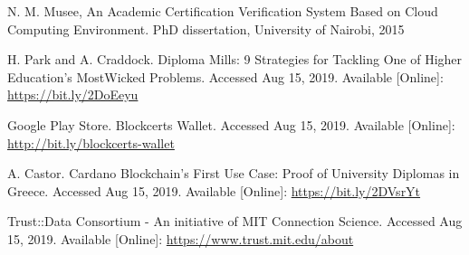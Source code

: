 \begin{thebibliography}{99}
 N. M. Musee, An Academic Certification Verification System Based on Cloud Computing Environment.
PhD dissertation, University of Nairobi, 2015

 H. Park and A. Craddock. Diploma Mills: 9 Strategies for Tackling One of Higher Education's
MostWicked Problems. Accessed Aug 15, 2019. Available [Online]: \url{https://bit.ly/2DoEeyu}

 Google Play Store. Blockcerts Wallet. Accessed Aug 15, 2019. Available [Online]: \url{http://bit.ly/blockcerts-wallet}

 A. Castor. Cardano Blockchain's First Use Case: Proof of University Diplomas in Greece.
Accessed Aug 15, 2019. Available [Online]: \url{https://bit.ly/2DVsrYt}

 Trust::Data Consortium - An initiative of MIT Connection Science. Accessed Aug 15, 2019. Available
[Online]: \url{https://www.trust.mit.edu/about}

\end{thebibliography}

